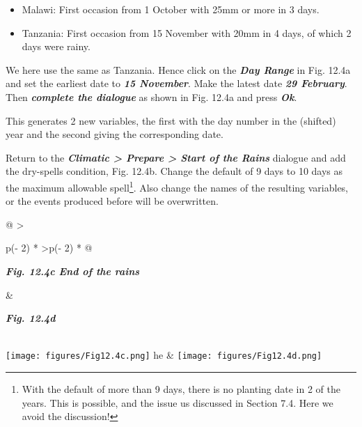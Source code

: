 \documentclass[
  letterpaper,
  DIV=11,
  numbers=noendperiod]{scrreprt}
\begin{document}
\begin{itemize}
\item
  Malawi: First occasion from 1 October with 25mm or more in 3 days.
\item
  Tanzania: First occasion from 15 November with 20mm in 4 days, of
  which 2 days were rainy.
\end{itemize}

We here use the same as Tanzania. Hence click on the \textbf{\emph{Day
Range}} in Fig. 12.4a and set the earliest date to \textbf{\emph{15
November}}. Make the latest date \textbf{\emph{29 February}}. Then
\textbf{\emph{complete the dialogue}} as shown in Fig. 12.4a and press
\textbf{\emph{Ok}}.

This generates 2 new variables, the first with the day number in the
(shifted) year and the second giving the corresponding date.

Return to the \textbf{\emph{Climatic \textgreater{} Prepare
\textgreater{} Start of the Rains}} dialogue and add the dry-spells
condition, Fig. 12.4b. Change the default of 9 days to 10 days as the
maximum allowable spell\footnote{With the default of more than 9 days,
  there is no planting date in 2 of the years. This is possible, and the
  issue us discussed in Section 7.4. Here we avoid the discussion!}.
Also change the names of the resulting variables, or the events produced
before will be overwritten.

\begin{longtable}[]{@{}
  >{\raggedright\arraybackslash}p{(\columnwidth - 2\tabcolsep) * }
  >{\centering\arraybackslash}p{(\columnwidth - 2\tabcolsep) * }@{}}
\toprule\noalign{}
\begin{minipage}[b]{\linewidth}\raggedright
\textbf{\emph{Fig. 12.4c End of the rains}}
\end{minipage} & \begin{minipage}[b]{\linewidth}\centering
\textbf{\emph{Fig. 12.4d}}
\end{minipage} \\
\midrule\noalign{}
\endhead
\bottomrule\noalign{}
\endlastfoot
\texttt{[image: figures/Fig12.4c.png]}
he &
\texttt{[image: figures/Fig12.4d.png]} \\
\end{longtable}
\end{document}
